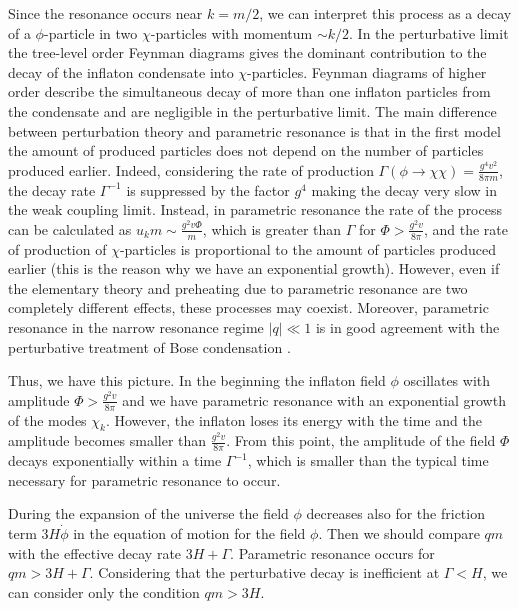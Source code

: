 \documentclass[11pt,a4paper,twoside]{book}
\begin{document}
Since the resonance occurs near $ k=m/2 $, we can interpret this process as a decay of a $ \phi $-particle in two $ \chi $-particles with momentum $\sim k/2$.
In the perturbative limit the tree-level order Feynman diagrams gives the dominant contribution to the decay of the inflaton condensate into $ \chi $-particles. Feynman diagrams of higher order describe the simultaneous decay of more than one inflaton particles from the condensate and are negligible in the perturbative limit.
The main difference between  perturbation theory and parametric resonance is that in the first model the amount of produced particles does not depend on the number of particles produced earlier. Indeed, considering the rate of production $ \Gamma(\phi \rightarrow \chi \chi) = \frac{g^{4}v^{2}}{8\pi m} $, the decay rate $ \Gamma^{-1} $ is suppressed by the factor $ g^{4} $ making the decay very slow in the weak coupling limit. Instead, in parametric resonance the rate of the process can be calculated as $ u_{k}m \sim \frac{g^{2} v \Phi}{m} $, which is greater than $\Gamma$ for $ \Phi > \frac{g^{2}v}{8\pi} $, and the rate of production of $ \chi $-particles is proportional to the amount of particles produced earlier (this is the reason why we have an exponential growth). However, even if the elementary theory and preheating due to parametric resonance are two completely different effects, these processes may coexist. Moreover, parametric resonance in the narrow resonance regime  $ |q| \ll 1 $ is in good agreement with the perturbative treatment of Bose condensation \cite{Chap4:Lozanov}.

Thus, we have this picture. In the beginning the inflaton field $\phi$ oscillates with amplitude $ \Phi > \frac{g^{2} v}{8\pi} $ and we have parametric resonance with an exponential growth of the modes $\chi_{k}$. However, the inflaton loses its energy with the time and the amplitude becomes smaller than $ \frac{g^{2}v}{8\pi} $. From this point, the amplitude of the field $ \Phi $ decays exponentially within a time $ \Gamma^{-1} $, which is smaller than the typical time necessary for parametric resonance to occur. 

During the expansion of the universe the field $\phi$ decreases also for the friction term $ 3H\dot{\phi} $ in the equation of motion for the field $\phi$. Then we should compare $ qm $ with the effective decay rate $ 3H + \Gamma $. Parametric resonance occurs for $ qm > 3H + \Gamma $. Considering that the perturbative decay is inefficient at $ \Gamma < H $, we can consider only the condition $ qm > 3H $.
\end{document}
